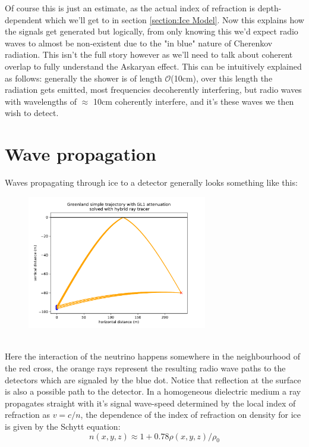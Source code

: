 \documentclass[11pt,a4paper,faculty=we,language=en,doctype=report]{cls/ugent-doc}
\begin{document}
Of course this is just an estimate, as the actual index of refraction is depth-dependent which
we'll get to in section \ref{section:Ice Model}.
Now this explains how the signals get generated but logically, from only knowing this
we'd expect radio waves to almost be non-existent 
due to the "in blue" nature of Cherenkov radiation. 
This isn't the full story however as we'll need to talk about coherent overlap
to fully understand the Askaryan effect. This can be intuitively explained as
follows: generally the shower is of length
$\mathcal{O}$(10cm)\cite{Huege_2017}, over this length the radiation gets
emitted, most frequencies decoherently interfering, but radio waves with wavelengths of 
$\approx$ 10cm coherently interfere, and it's these waves we then wish to detect.
\section{Wave propagation}
Waves propagating through ice to a detector generally looks something like this:
\begin{figure}[h!]
	\centering
	\includegraphics[width=0.7\textwidth]{Path_illu.pdf}
\end{figure}\\
Here the interaction of the neutrino happens somewhere in the neighbourhood of the red cross,
the orange rays represent the resulting radio wave paths to the detectors which are signaled
by the blue dot. Notice that reflection at the surface is also a
possible path to the detector.
In a homogeneous dielectric medium a ray propagates straight 
with it's signal wave-speed determined by the local index of 
refraction as $v = c/n$, 
the dependence of the index of refraction on density
for ice is given by the Schytt equation:
\begin{equation}
	n(x,y,z) \approx 1 + 0.78\rho(x,y,z)/\rho_0
\end{equation}
\end{document}
